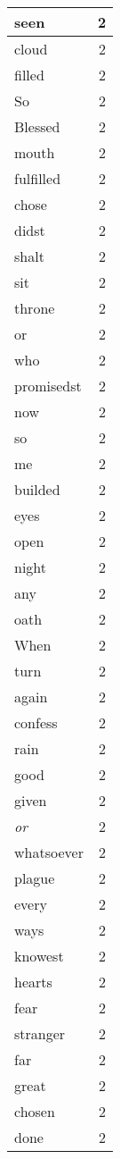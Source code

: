 \begin{center}
\begin{longtable}{l|r}
seen & 2 \\ \hline
cloud & 2 \\ \hline
filled & 2 \\ \hline
So & 2 \\ \hline
Blessed & 2 \\ \hline
mouth & 2 \\ \hline
fulfilled & 2 \\ \hline
chose & 2 \\ \hline
didst & 2 \\ \hline
shalt & 2 \\ \hline
sit & 2 \\ \hline
throne & 2 \\ \hline
or & 2 \\ \hline
who & 2 \\ \hline
promisedst & 2 \\ \hline
now & 2 \\ \hline
so & 2 \\ \hline
me & 2 \\ \hline
builded & 2 \\ \hline
eyes & 2 \\ \hline
open & 2 \\ \hline
night & 2 \\ \hline
any & 2 \\ \hline
oath & 2 \\ \hline
When & 2 \\ \hline
turn & 2 \\ \hline
again & 2 \\ \hline
confess & 2 \\ \hline
rain & 2 \\ \hline
good & 2 \\ \hline
given & 2 \\ \hline
\emph{or} & 2 \\ \hline
whatsoever & 2 \\ \hline
plague & 2 \\ \hline
every & 2 \\ \hline
ways & 2 \\ \hline
knowest & 2 \\ \hline
hearts & 2 \\ \hline
fear & 2 \\ \hline
stranger & 2 \\ \hline
far & 2 \\ \hline
great & 2 \\ \hline
chosen & 2 \\ \hline
done & 2 \\ \hline

\end{longtable}
\end{center}
